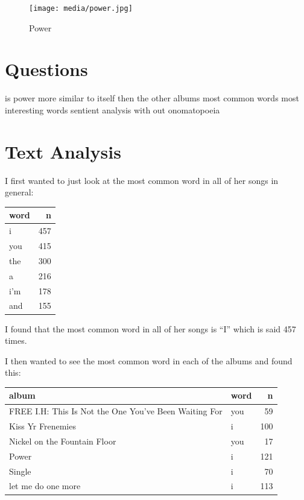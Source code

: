 \documentclass[
  letterpaper,
  DIV=11,
  numbers=noendperiod]{scrartcl}
\begin{document}
\begin{figure}[H]

{\centering \texttt{[image: media/power.jpg]}

}

\caption{Power}

\end{figure}%

\section{Questions}\label{questions}

is power more similar to itself then the other albums most common words
most interesting words sentient analysis with out onomatopoeia

\section{Text Analysis}\label{text-analysis}

I first wanted to just look at the most common word in all of her songs
in general:

\begin{longtable}[]{@{}lr@{}}
\toprule\noalign{}
word & n \\
\midrule\noalign{}
\endhead
\bottomrule\noalign{}
\endlastfoot
i & 457 \\
you & 415 \\
the & 300 \\
a & 216 \\
i'm & 178 \\
and & 155 \\
\end{longtable}

I found that the most common word in all of her songs is ``I'' which is
said 457 times.

I then wanted to see the most common word in each of the albums and
found this:

\begin{longtable}[]{@{}llr@{}}
\toprule\noalign{}
album & word & n \\
\midrule\noalign{}
\endhead
\bottomrule\noalign{}
\endlastfoot
FREE I.H: This Is Not the One You've Been Waiting For & you & 59 \\
Kiss Yr Frenemies & i & 100 \\
Nickel on the Fountain Floor & you & 17 \\
Power & i & 121 \\
Single & i & 70 \\
let me do one more & i & 113 \\
\end{longtable}
\end{document}
